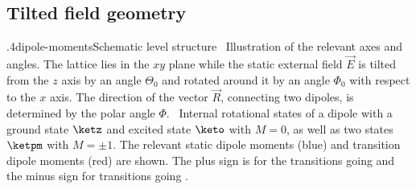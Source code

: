 \subsection{Tilted field geometry}
{.4}{dipole-moments}{Schematic level structure}
{\sfA~Illustration of the relevant axes and angles. The lattice lies in the $xy$ plane while the static external field $\vec{E}$ is tilted from the $z$ axis by an angle $\Theta_0$ and rotated around it by an angle $\Phi_0$ with respect to the $x$ axis. The direction of the vector $\vec{R}$, connecting two dipoles, is determined by the polar angle $\Phi$.
\sfB~Internal rotational states of a dipole with a ground state $\ketz$ and excited state $\keto$ with $M=0$, as well as two states $\ketpm$ with $M=\pm 1$. The relevant static dipole moments (blue) and transition dipole moments (red) are shown. The plus sign is for the transitions going  and the minus sign for transitions going .}


